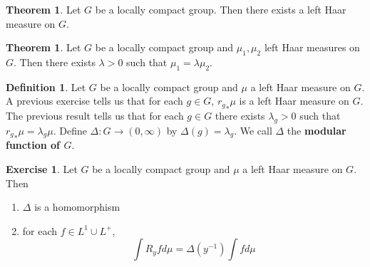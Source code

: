 \documentclass[12pt]{amsart}
\theoremstyle{definition}
\newtheorem{defn}[definition]{Definition}
\newtheorem{thm}[definition]{Theorem}
\newtheorem{ex}[definition]{Exercise}
\newcommand{\Del}{\Delta}
\newcommand{\lam}{\lambda}
\newcommand{\lex}[1]{\label{ex:#1}}
\newcommand{\ld}[1]{\label{defn:#1}}
\begin{document}
	\begin{thm}
		Let $G$ be a locally compact group. Then there exists a left Haar measure on $G$. 
	\end{thm}
	
	\begin{thm}
		Let $G$ be a locally compact group and $\mu_1, \mu_2$ left Haar measures on $G$. Then there exists $\lam > 0$ such that $\mu_1 = \lam \mu_2 $.
	\end{thm}
	
	\begin{defn} \ld{00000} 
		Let $G$ be a locally compact group and $\mu$ a left Haar measure on $G$. A previous exercise tells us that for each $g \in G$, ${r_g}_*\mu$ is a left Haar measure on $G$. The previous result tells us that for each $g \in G$ there exists $\lam_g >0$ such that ${r_g}_*\mu = \lam_g \mu$. Define $\Del: G \rightarrow (0, \infty)$ by $\Del(g) = \lam_g$. We call $\Del$ the \textbf{modular function of $G$}. 
	\end{defn}

	\begin{ex} \lex{00000} 
		Let $G$ be a locally compact group and $\mu$ a left Haar measure on $G$. Then 
		\begin{enumerate}
			\item $\Del $ is a homomorphism 
			\item for each $f \in L^1 \cup L^+$, $$\int R_y f d \mu = \Del(y^{-1}) \int f d \mu$$
		\end{enumerate}
	\end{ex}
\end{document}
